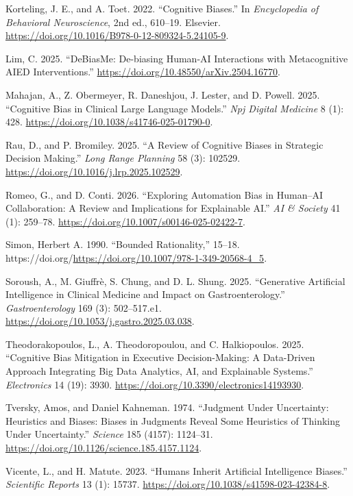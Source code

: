 \documentclass[
  letterpaper,
  DIV=11,
  numbers=noendperiod]{scrartcl}
\newlength{\cslhangindent}
\newenvironment{CSLReferences}[2] %
 {\begin{list}{}{%
  \setlength{\itemindent}{0pt}
  \setlength{\leftmargin}{0pt}
  \setlength{\parsep}{0pt}
  \ifodd #1
   \setlength{\leftmargin}{\cslhangindent}
   \setlength{\itemindent}{-1\cslhangindent}
  \fi
  \setlength{\itemsep}{#2\baselineskip}}}
 {\end{list}}
\begin{document}
\begin{CSLReferences}{1}{0}
Korteling, J. E., and A. Toet. 2022. {``Cognitive Biases.''} In
\emph{Encyclopedia of Behavioral Neuroscience}, 2nd ed., 610--19.
Elsevier. \url{https://doi.org/10.1016/B978-0-12-809324-5.24105-9}.

Lim, C. 2025. {``{DeBiasMe}: {De-biasing} Human-{AI} Interactions with
Metacognitive {AIED} Interventions.''}
\url{https://doi.org/10.48550/arXiv.2504.16770}.

Mahajan, A., Z. Obermeyer, R. Daneshjou, J. Lester, and D. Powell. 2025.
{``Cognitive Bias in Clinical Large Language Models.''} \emph{Npj
Digital Medicine} 8 (1): 428.
\url{https://doi.org/10.1038/s41746-025-01790-0}.

Rau, D., and P. Bromiley. 2025. {``A Review of Cognitive Biases in
Strategic Decision Making.''} \emph{Long Range Planning} 58 (3): 102529.
\url{https://doi.org/10.1016/j.lrp.2025.102529}.

Romeo, G., and D. Conti. 2026. {``Exploring Automation Bias in
Human--{AI} Collaboration: {A} Review and Implications for Explainable
{AI}.''} \emph{AI \& Society} 41 (1): 259--78.
\url{https://doi.org/10.1007/s00146-025-02422-7}.

Simon, Herbert A. 1990. {``Bounded Rationality,''} 15--18.
https://doi.org/\url{https://doi.org/10.1007/978-1-349-20568-4_5}.

Soroush, A., M. Giuffrè, S. Chung, and D. L. Shung. 2025. {``Generative
Artificial Intelligence in Clinical Medicine and Impact on
Gastroenterology.''} \emph{Gastroenterology} 169 (3): 502--517.e1.
\url{https://doi.org/10.1053/j.gastro.2025.03.038}.

Theodorakopoulos, L., A. Theodoropoulou, and C. Halkiopoulos. 2025.
{``Cognitive Bias Mitigation in Executive Decision-Making: {A}
Data-Driven Approach Integrating Big Data Analytics, {AI}, and
Explainable Systems.''} \emph{Electronics} 14 (19): 3930.
\url{https://doi.org/10.3390/electronics14193930}.

Tversky, Amos, and Daniel Kahneman. 1974. {``Judgment Under Uncertainty:
Heuristics and Biases: Biases in Judgments Reveal Some Heuristics of
Thinking Under Uncertainty.''} \emph{Science} 185 (4157): 1124--31.
\url{https://doi.org/10.1126/science.185.4157.1124}.

Vicente, L., and H. Matute. 2023. {``Humans Inherit Artificial
Intelligence Biases.''} \emph{Scientific Reports} 13 (1): 15737.
\url{https://doi.org/10.1038/s41598-023-42384-8}.

\end{CSLReferences}
\end{document}

